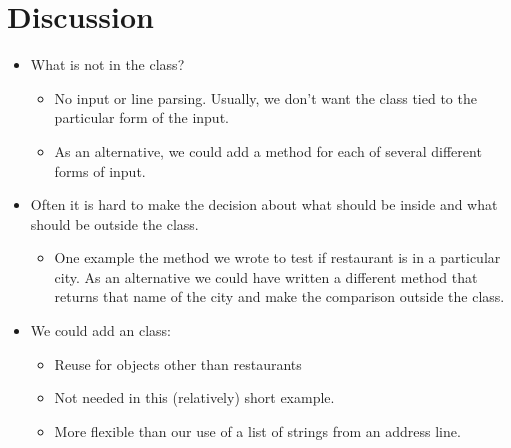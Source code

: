 \documentclass[letterpaper,10pt,english]{sphinxmanual}
\begin{document}
\section{Discussion}
\label{\detokenize{lecture_notes/lec19_classes2:discussion}}\begin{itemize}
\item {} 
What is not in the  class?
\begin{itemize}
\item {} 
No input or line parsing. Usually, we don’t want the class tied to
the particular form of the input.

\item {} 
As an alternative, we could add a method for each of several
different forms of input.

\end{itemize}

\item {} 
Often it is hard to make the decision about what should be inside and
what should be outside the class.
\begin{itemize}
\item {} 
One example the method we wrote to test if
restaurant is in a particular city.  As an alternative we could
have written a
different method that returns that name of the city and make the
comparison outside the class.

\end{itemize}

\item {} 
We could add an  class:
\begin{itemize}
\item {} 
Reuse for objects other than restaurants

\item {} 
Not needed in this (relatively) short example.

\item {} 
More flexible than our use of a list of strings from an address
line.

\end{itemize}

\end{itemize}
\end{document}
